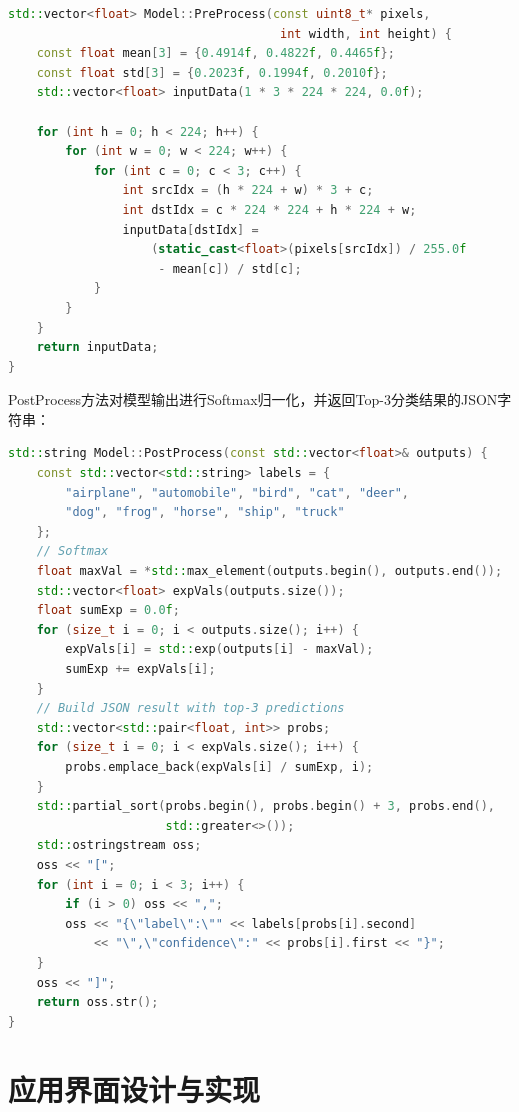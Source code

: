 \begin{lstlisting}[language=C++, caption={PreProcess方法实现}]
std::vector<float> Model::PreProcess(const uint8_t* pixels,
                                      int width, int height) {
    const float mean[3] = {0.4914f, 0.4822f, 0.4465f};
    const float std[3] = {0.2023f, 0.1994f, 0.2010f};
    std::vector<float> inputData(1 * 3 * 224 * 224, 0.0f);

    for (int h = 0; h < 224; h++) {
        for (int w = 0; w < 224; w++) {
            for (int c = 0; c < 3; c++) {
                int srcIdx = (h * 224 + w) * 3 + c;
                int dstIdx = c * 224 * 224 + h * 224 + w;
                inputData[dstIdx] =
                    (static_cast<float>(pixels[srcIdx]) / 255.0f
                     - mean[c]) / std[c];
            }
        }
    }
    return inputData;
}
\end{lstlisting}

PostProcess方法对模型输出进行Softmax归一化，并返回Top-3分类结果的JSON字符串：

\begin{lstlisting}[language=C++, caption={PostProcess方法实现}]
std::string Model::PostProcess(const std::vector<float>& outputs) {
    const std::vector<std::string> labels = {
        "airplane", "automobile", "bird", "cat", "deer",
        "dog", "frog", "horse", "ship", "truck"
    };
    // Softmax
    float maxVal = *std::max_element(outputs.begin(), outputs.end());
    std::vector<float> expVals(outputs.size());
    float sumExp = 0.0f;
    for (size_t i = 0; i < outputs.size(); i++) {
        expVals[i] = std::exp(outputs[i] - maxVal);
        sumExp += expVals[i];
    }
    // Build JSON result with top-3 predictions
    std::vector<std::pair<float, int>> probs;
    for (size_t i = 0; i < expVals.size(); i++) {
        probs.emplace_back(expVals[i] / sumExp, i);
    }
    std::partial_sort(probs.begin(), probs.begin() + 3, probs.end(),
                      std::greater<>());
    std::ostringstream oss;
    oss << "[";
    for (int i = 0; i < 3; i++) {
        if (i > 0) oss << ",";
        oss << "{\"label\":\"" << labels[probs[i].second]
            << "\",\"confidence\":" << probs[i].first << "}";
    }
    oss << "]";
    return oss.str();
}
\end{lstlisting}

\section{应用界面设计与实现}

